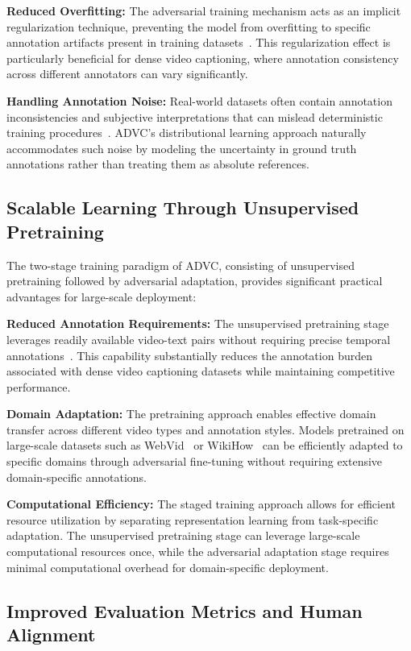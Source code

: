 \textbf{Reduced Overfitting:} The adversarial training mechanism acts as an implicit regularization technique, preventing the model from overfitting to specific annotation artifacts present in training datasets~\cite{Donahue2018-ez}. This regularization effect is particularly beneficial for dense video captioning, where annotation consistency across different annotators can vary significantly.

\textbf{Handling Annotation Noise:} Real-world datasets often contain annotation inconsistencies and subjective interpretations that can mislead deterministic training procedures~\cite{Kandpal2023-ud}. ADVC's distributional learning approach naturally accommodates such noise by modeling the uncertainty in ground truth annotations rather than treating them as absolute references.

\subsection{Scalable Learning Through Unsupervised Pretraining}

The two-stage training paradigm of ADVC, consisting of unsupervised pretraining followed by adversarial adaptation, provides significant practical advantages for large-scale deployment:

\textbf{Reduced Annotation Requirements:} The unsupervised pretraining stage leverages readily available video-text pairs without requiring precise temporal annotations~\cite{Miech2019-hk,Huang2020-as}. This capability substantially reduces the annotation burden associated with dense video captioning datasets while maintaining competitive performance.

\textbf{Domain Adaptation:} The pretraining approach enables effective domain transfer across different video types and annotation styles. Models pretrained on large-scale datasets such as WebVid~\cite{Bain2021-si} or WikiHow~\cite{Koupaee2018-et} can be efficiently adapted to specific domains through adversarial fine-tuning without requiring extensive domain-specific annotations.

\textbf{Computational Efficiency:} The staged training approach allows for efficient resource utilization by separating representation learning from task-specific adaptation. The unsupervised pretraining stage can leverage large-scale computational resources once, while the adversarial adaptation stage requires minimal computational overhead for domain-specific deployment.

\subsection{Improved Evaluation Metrics and Human Alignment}

